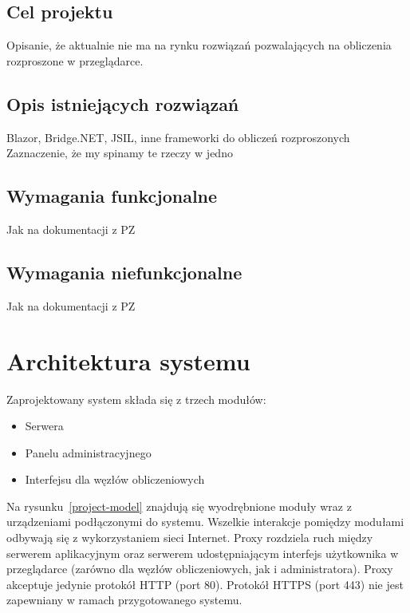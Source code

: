 \documentclass[a4paper,11pt,twoside]{report}
\theoremstyle{definition}
\begin{document}
    \section{Cel projektu}
        Opisanie, że aktualnie nie ma na rynku rozwiązań pozwalających na obliczenia rozproszone w przeglądarce.
    
    \section{Opis istniejących rozwiązań}
        Blazor, Bridge.NET, JSIL, inne frameworki do obliczeń rozproszonych
        Zaznaczenie, że my spinamy te rzeczy w jedno
        
    \section{Wymagania funkcjonalne}
        Jak na dokumentacji z PZ
        
    \section{Wymagania niefunkcjonalne}
        Jak na dokumentacji z PZ
    
\chapter{Architektura systemu}
 Zaprojektowany system składa się z trzech modułów:

\begin{itemize}
    \item Serwera
    \item Panelu administracyjnego
    \item Interfejsu dla węzłów obliczeniowych
\end{itemize}

Na rysunku~\ref{project-model} znajdują się wyodrębnione moduły wraz z urządzeniami podłączonymi do systemu. Wszelkie interakcje pomiędzy modułami odbywają się z wykorzystaniem sieci Internet. Proxy rozdziela ruch między serwerem aplikacyjnym oraz serwerem udostępniającym interfejs użytkownika w przeglądarce (zarówno dla węzłów obliczeniowych, jak i administratora). Proxy akceptuje jedynie protokół HTTP (port 80). Protokół HTTPS (port 443) nie jest zapewniany w ramach przygotowanego systemu.
\end{document}
